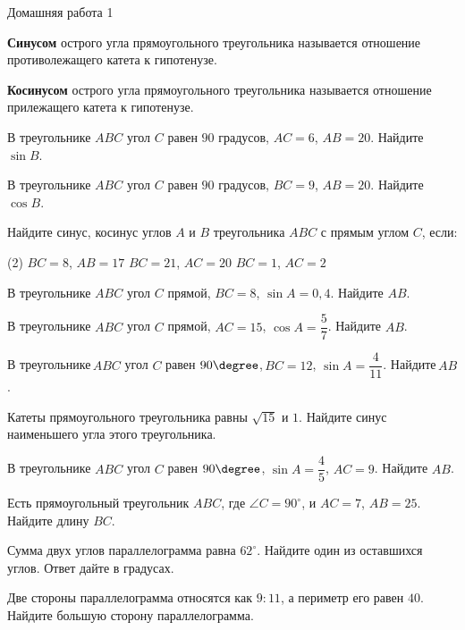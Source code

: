 \begin{homework}[number=1]
	\begin{listofex}
		\item Домашняя работа 1
	\end{listofex}
\end{homework}

\begin{class}[number=3]\begin{definit}
		\textbf{Синусом} острого угла прямоугольного треугольника называется отношение противолежащего катета к гипотенузе.
	\end{definit}
	\begin{definit}
		\textbf{Косинусом} острого угла прямоугольного треугольника называется отношение прилежащего катета к гипотенузе.
	\end{definit}
	\begin{listofex}
		\item В треугольнике \( ABC \) угол \( C \) равен \( 90 \) градусов, \( AC=6 \), \( AB=20 \). Найдите \( \sin B \).
		\item  В треугольнике \( ABC \) угол \( C \) равен \( 90 \) градусов, \( BC=9 \), \( AB=20 \). Найдите \( \cos B \).
		\item Найдите синус, косинус углов \( A \) и \( B \) треугольника \( ABC \) с прямым углом \( C \), если:
		\begin{tasks}(2)
			\task \( BC=8 \), \( AB=17 \)
			\task \( BC=21 \), \( AC=20 \)
			\task \( BC=1 \), \( AC=2 \)
		\end{tasks}
		
		\item В треугольнике \( ABC \) угол \( C \) прямой, \( BC=8 \), \( \sin A=0,4 \). Найдите \( AB \).
		\item В треугольнике \( ABC \) угол \( C \) прямой, \( AC=15 \), \( \cos A=\dfrac{5}{7} \). Найдите \( AB \).
		\item В треугольнике \( ABC \) угол \( C \) равен \( 90\degree \), \( BC=12 \), \( \sin A=\dfrac{4}{11} \). Найдите \( AB \).
		\item Катеты прямоугольного треугольника равны \( \sqrt{15} \) и \( 1 \). Найдите синус наименьшего угла этого треугольника.
		\item В треугольнике \( ABC \) угол \( C \) равен \( 90\degree \), \( \sin A=\dfrac{4}{5} \), \( AC=9 \). Найдите \( AB \).
		\item  Есть прямоугольный треугольник \( ABC \), где \( \angle C=90^{\circ} \), и \( AC=7 \), \( AB=25 \). Найдите длину \( BC \).
		\item Сумма двух углов параллелограмма равна \( 62^{\circ} \). Найдите один из оставшихся углов. Ответ дайте в градусах.
		\item Две стороны параллелограмма относятся как \( 9:11 \), а периметр его равен \( 40 \). Найдите большую сторону параллелограмма.
	\end{listofex}
\end{class}

